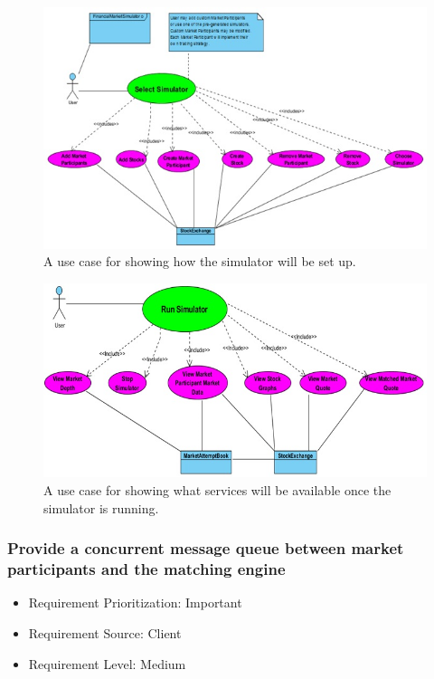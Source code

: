 \documentclass[12pt]{article}
\begin{document}
			\begin{figure}[th]
			\centering
			\includegraphics[scale=0.8]{./USE_CASE_Select_Simulator_Financial_Market_Simulator}
			\caption{A use case for showing how the simulator will be set up.}
			\label{domain objects}
			\end{figure}
				
			\begin{figure}[th!]
			\centering
			\includegraphics[scale=0.8]{./USE_CASE_Run_Simulator_Financial_Market_Simulator}
			\caption{A use case for showing what services will be available once the simulator is running.}
			\label{domain objects}
			\end{figure}
	
			\subsubsection{Provide a concurrent message queue between market participants and the matching engine}
			\begin{itemize}
				\item Requirement Prioritization: Important
				\item Requirement Source: Client 
				\item Requirement Level: Medium	
			\end{itemize}
			
\end{document}
